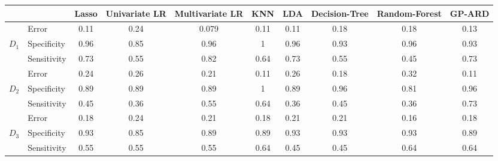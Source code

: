 \begin{tabular}{l l | c | c | c | c | c | c | c | c } 
 \hline 
 &  & Lasso & Univariate LR & Multivariate LR & KNN & LDA & Decision-Tree & Random-Forest & GP-ARD \\ 
 \hline 
   & Error  & 0.11 & 0.24 & 0.079 & 0.11 & 0.11 & 0.18 & 0.18 & 0.13 \\ 
 $D_1$ & Specificity  & 0.96 & 0.85 & 0.96 & 1 & 0.96 & 0.93 & 0.96 & 0.93 \\ 
 & Sensitivity  & 0.73 & 0.55 & 0.82 & 0.64 & 0.73 & 0.55 & 0.45 & 0.73 \\ 
 \hline 
   & Error  & 0.24 & 0.26 & 0.21 & 0.11 & 0.26 & 0.18 & 0.32 & 0.11 \\ 
 $D_2$ & Specificity  & 0.89 & 0.89 & 0.89 & 1 & 0.89 & 0.96 & 0.81 & 0.96 \\ 
 & Sensitivity  & 0.45 & 0.36 & 0.55 & 0.64 & 0.36 & 0.45 & 0.36 & 0.73 \\ 
 \hline 
   & Error  & 0.18 & 0.24 & 0.21 & 0.18 & 0.21 & 0.21 & 0.16 & 0.18 \\ 
 $D_3$ & Specificity  & 0.93 & 0.85 & 0.89 & 0.89 & 0.93 & 0.93 & 0.93 & 0.89 \\ 
 & Sensitivity  & 0.55 & 0.55 & 0.55 & 0.64 & 0.45 & 0.45 & 0.64 & 0.64 \\ 
\hline 
\end{tabular} 


